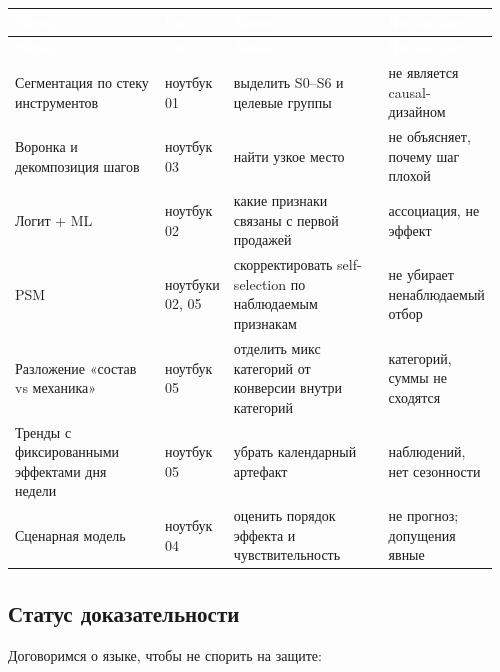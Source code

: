 \documentclass[10pt,a4paper]{article}
\begin{document}
\begingroup
\small
\setlength{\tabcolsep}{3pt}
\renewcommand{\arraystretch}{1.12}
\begin{longtable}{@{}>{\raggedright\arraybackslash}p{0.3116\linewidth}>{\raggedright\arraybackslash}p{0.1062\linewidth}>{\raggedright\arraybackslash}p{0.3257\linewidth}>{\raggedright\arraybackslash}p{0.2195\linewidth}@{}}
\rowcolor{blue}
\textcolor{white}{\textbf{Метод}} & \textcolor{white}{\textbf{Где}} & \textcolor{white}{\textbf{Зачем}} & \textcolor{white}{\textbf{Что не даёт}} \\
\endfirsthead
\rowcolor{blue}
\textcolor{white}{\textbf{Метод}} & \textcolor{white}{\textbf{Где}} & \textcolor{white}{\textbf{Зачем}} & \textcolor{white}{\textbf{Что не даёт}} \\
\endhead
\hline
Сегментация по стеку инструментов & ноутбук 01 & выделить S0–S6 и целевые группы & не является causal-дизайном \\
Воронка и декомпозиция шагов & ноутбук 03 & найти узкое место & не объясняет, почему шаг плохой \\
Логит + ML & ноутбук 02 & какие признаки связаны с первой продажей & ассоциация, не эффект \\
PSM & ноутбуки 02, 05 & скорректировать self-selection по наблюдаемым признакам & не убирает ненаблюдаемый отбор \\
Разложение «состав vs механика» & ноутбук 05 & отделить микс категорий от конверсии внутри категорий & 17 категорий, суммы не сходятся \\
Тренды с фиксированными эффектами дня недели & ноутбук 05 & убрать календарный артефакт & 30 наблюдений, нет сезонности \\
Сценарная модель & ноутбук 04 & оценить порядок эффекта и чувствительность & не прогноз; допущения явные \\
\hline
\end{longtable}
\endgroup
\vspace{4pt}

\subsection{Статус доказательности}

Договоримся о языке, чтобы не спорить на защите:\par
\end{document}
